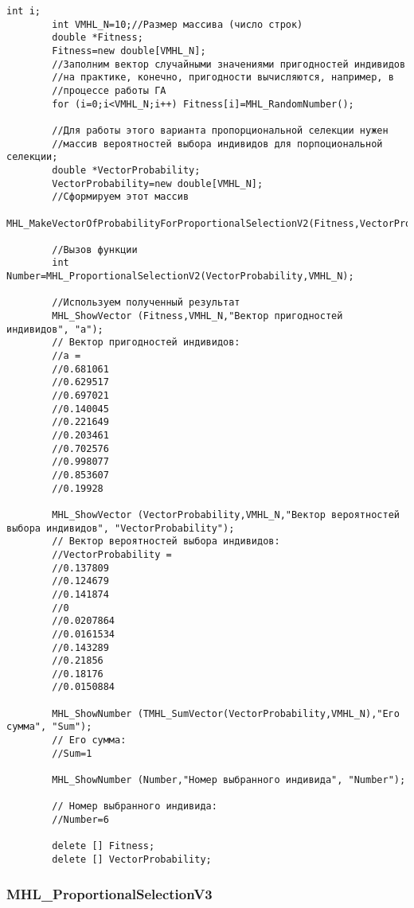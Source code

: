 \documentclass[a4paper,12pt]{article}
\begin{document}
\begin{lstlisting}[label=code_use_MHL_ProportionalSelectionV2,caption=Пример использования]
        int i;
        int VMHL_N=10;//Размер массива (число строк)
        double *Fitness;
        Fitness=new double[VMHL_N];
        //Заполним вектор случайными значениями пригодностей индивидов
        //на практике, конечно, пригодности вычисляются, например, в
        //процессе работы ГА
        for (i=0;i<VMHL_N;i++) Fitness[i]=MHL_RandomNumber();

        //Для работы этого варианта пропорциональной селекции нужен
        //массив вероятностей выбора индивидов для порпоциональной селекции;
        double *VectorProbability;
        VectorProbability=new double[VMHL_N];
        //Сформируем этот массив
        MHL_MakeVectorOfProbabilityForProportionalSelectionV2(Fitness,VectorProbability,VMHL_N);

        //Вызов функции
        int Number=MHL_ProportionalSelectionV2(VectorProbability,VMHL_N);

        //Используем полученный результат
        MHL_ShowVector (Fitness,VMHL_N,"Вектор пригодностей индивидов", "a");
        // Вектор пригодностей индивидов:
        //a =	
        //0.681061
        //0.629517
        //0.697021
        //0.140045
        //0.221649
        //0.203461
        //0.702576
        //0.998077
        //0.853607
        //0.19928

        MHL_ShowVector (VectorProbability,VMHL_N,"Вектор вероятностей выбора индивидов", "VectorProbability");
        // Вектор вероятностей выбора индивидов:
        //VectorProbability =	
        //0.137809
        //0.124679
        //0.141874
        //0
        //0.0207864
        //0.0161534
        //0.143289
        //0.21856
        //0.18176
        //0.0150884

        MHL_ShowNumber (TMHL_SumVector(VectorProbability,VMHL_N),"Его сумма", "Sum");
        // Его сумма:
        //Sum=1
                
        MHL_ShowNumber (Number,"Номер выбранного индивида", "Number");
        
        // Номер выбранного индивида:
        //Number=6
        
        delete [] Fitness;
        delete [] VectorProbability;
\end{lstlisting}

\subsubsection{MHL\_ProportionalSelectionV3}\label{MHL_ProportionalSelectionV3}
\end{document}
